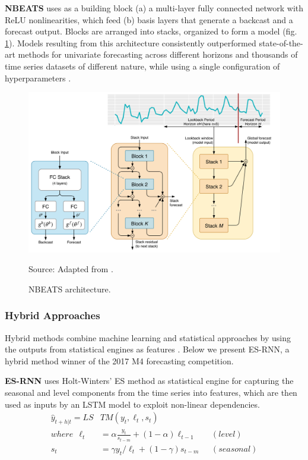 \noindent
\textbf{NBEATS} uses as a building block (a) a multi-layer fully connected network with ReLU nonlinearities, which feed (b) basis layers that generate a backcast and a forecast output.
Blocks are arranged into stacks, organized to form a model (fig. \ref{fig:nbeats}).
Models resulting from this architecture consistently outperformed state-of-the-art methods for univariate forecasting across different horizons and thousands of time series datasets of different nature, while using a single configuration of hyperparameters \cite{oreshkin2019nbeats}.
\begin{figure}[H]
   \centering
    \caption{NBEATS architecture.}
    \includegraphics[scale=0.3]{nbeats.png}  \\
    \raggedright
    Source: Adapted from \cite{oreshkin2019nbeats}.
   \label{fig:nbeats}
\end{figure}

\subsubsection{Hybrid Approaches}
Hybrid methods combine machine learning and statistical approaches by using the outputs from statistical engines as features \cite{oreshkin2019nbeats}. Below we present ES-RNN, a hybrid method winner of the 2017 M4 forecasting competition.

\vspace{1em}
\noindent
\textbf{ES-RNN} uses Holt-Winters' ES method as statistical engine for capturing the seasonal and level components from the time series into features, which are then used as inputs by an LSTM model to exploit non-linear dependencies.
\begin{equation}\label{eq:esrnn}
    \begin{aligned}
    \hat{y}_{t+h|t} = LS&TM(y_t,\ell_t, s_t)\\
    where \ \ \ell_t &= \alpha \frac{y_t}{s_{t-m}} + (1-\alpha)\ell_{t-1}   &(level) \\
    s_t &= \gamma y_t/\ell_{t} + (1-\gamma)s_{t-m} \ \ \ &(seasonal)
    \end{aligned}
\end{equation}

